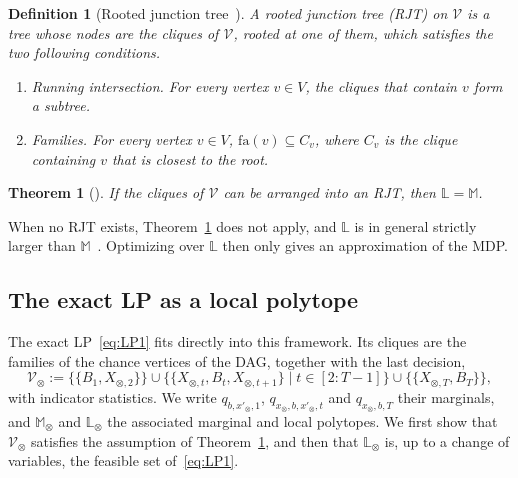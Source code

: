 \documentclass{article}
\newtheorem{theorem}[proposition]{Theorem}
\newtheorem{definition}[proposition]{Definition}
\begin{document}
\begin{definition}[Rooted junction tree~\cite{parmentier2019integer}]
\label{def:rjt}
A \emph{rooted junction tree} (RJT) on $\mathcal{V}$ is a tree whose nodes are the cliques of $\mathcal{V}$, rooted at
one of them, which satisfies the two following conditions.
\begin{enumerate}[label=(\roman*)]
  \item \emph{Running intersection}. For every vertex $v \in V$, the cliques that contain $v$ form a subtree.
  \item \emph{Families}. For every vertex $v \in V$, $\mathrm{fa}(v) \subseteq C_v$, where $C_v$ is the clique
        containing $v$ that is closest to the root.
\end{enumerate}
\end{definition}

\begin{theorem}[{\cite[Theorem~2]{parmentier2019integer}}]
\label{thm:rjt}
If the cliques of $\mathcal{V}$ can be arranged into an RJT, then $\mathbb{L} = \mathbb{M}$.
\end{theorem}

When no RJT exists, Theorem~\ref{thm:rjt} does not apply, and $\mathbb{L}$ is in general strictly larger than
$\mathbb{M}$~\cite{wainwright2008graphical}. Optimizing over $\mathbb{L}$ then only gives an approximation of the MDP.

\subsection{The exact LP as a local polytope}
\label{sec:exact-local}

The exact LP~\eqref{eq:LP1} fits directly into this framework. Its cliques are the families of the chance vertices of
the DAG, together with the last decision,
\[
  \mathcal{V}_\otimes := \bigl\{\{B_1,X_{\otimes,2}\}\bigr\}
  \cup\bigl\{\{X_{\otimes,t},B_t,X_{\otimes,t+1}\} \mid t\in[2:T-1]\bigr\}
  \cup\bigl\{\{X_{\otimes,T},B_T\}\bigr\},
\]
with indicator statistics. We write $q_{b,x'_\otimes,1}$, $q_{x_\otimes,b,x'_\otimes,t}$ and $q_{x_\otimes,b,T}$ their
marginals, and $\mathbb{M}_\otimes$ and $\mathbb{L}_\otimes$ the associated marginal and local polytopes. We first show
that $\mathcal{V}_\otimes$ satisfies the assumption of Theorem~\ref{thm:rjt}, and then that $\mathbb{L}_\otimes$ is,
up to a change of variables, the feasible set of~\eqref{eq:LP1}.
\end{document}
